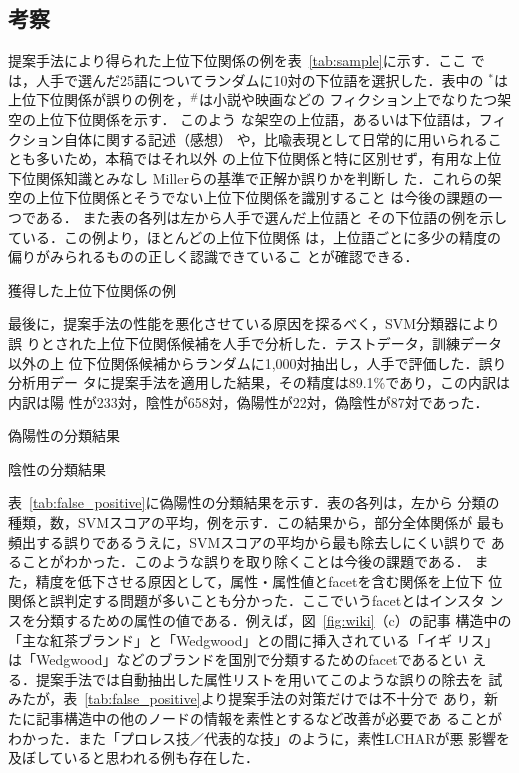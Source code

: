 \documentclass[japanese]{jnlp_1.4}
\begin{document}
\subsection{考察}

提案手法により得られた上位下位関係の例を表~\ref{tab:sample}に示す．ここ
では，人手で選んだ25語についてランダムに10対の下位語を選択した．表中の
${}^\ast$は上位下位関係が誤りの例を，${}^\#$は{小説や映画などの
  フィクション上でなりたつ}架空の上位下位関係を示す．{ このよう
  な架空の上位{語\nobreak，}あるいは下位語は，フィクション自体に関する記述（感想）
  や，比喩表現として日常的に用いられることも多いため，本稿ではそれ以外
  の上位下位関係と特に区別せず，有用な上位下位関係知識とみなし
  Millerら}\cite{wordnet-book_1998}{の基準で正解か誤りかを判断し
  た．これらの架空の上位下位関係とそうでない上位下位関係を識別すること
  は今後の課題の一つである．} また表の各列は左から人手で選んだ上位語と
その下位語の例を示している．{この例より，ほとんどの上位下位関係
  は，上位語ごとに多少の精度の偏りがみられるものの正しく認識できているこ
  とが確認できる．}
  

\begin{table}[p]
    \caption{獲得した上位下位関係の例}
\label{tab:sample}

\end{table}


最後に，提案手法の性能を悪化させている原因を探るべく，SVM分類器により誤
りとされた上位下位関係候補を人手で分析した．テストデータ，訓練データ以外の上
位下位関係候補からランダムに1,000対抽出し，人手で評価した．誤り分析用デー
タに提案手法を適用した結果，その精度は89.1\%であり，この内訳は内訳は陽
性が233対，陰性が658対，偽陽性が22対，偽陰性が87対であった．

\begin{table}[t]
    \caption{偽陽性の分類結果}
    \label{tab:false_positive}

\end{table}
\begin{table}[t]
    \caption{陰性の分類結果}
    \label{tab:true_negative}

\end{table}

表~\ref{tab:false_positive}に偽陽性の分類結果を示す．表の各列は，左から
分類の種類，数，SVMスコアの平均，例を示す．この結果から，部分全体関係が
最も頻出する誤りであるうえに，SVMスコアの平均から最も除去しにくい誤りで
あることがわかった．このような誤りを取り除くことは今後の課題である．
また，精度を低下させる原因として，属性・属性値とfacetを含む関係を上位下
位関係と誤判定する問題が多いことも分かった．ここでいうfacetとはインスタ
ンスを分類するための属性の値である．例えば，図~\ref{fig:wiki}（c）の記事
構造中の「主な紅茶ブランド」と「Wedgwood」との間に挿入されている「イギ
リス」は「Wedgwood」などのブランドを国別で分類するためのfacetであるとい
える．提案手法では自動抽出した属性リストを用いてこのような誤りの除去を
試みたが，表~\ref{tab:false_positive}より提案手法の対策だけでは不十分で
あり，新たに記事構造中の他のノードの情報を素性とするなど改善が必要であ
ることがわかった．また「プロレス技／代表的な技」のように，素性LCHARが悪
影響を及ぼしていると思われる例も存在した．
\end{document}
